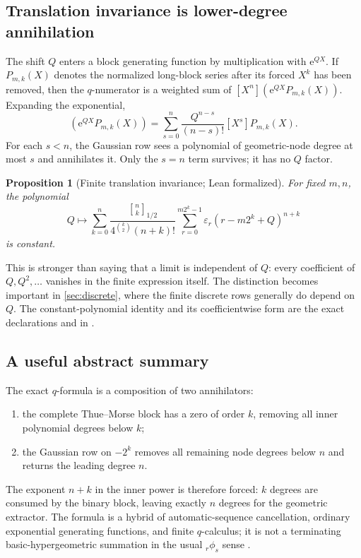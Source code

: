 \documentclass[11pt,oneside]{article}
\newtheorem{proposition}[theorem]{Proposition}
\theoremstyle{definition}
\theoremstyle{remark}
\newcommand{\e}{\mathrm e}
\newcommand{\qbinom}[3]{\genfrac{[}{]}{0pt}{}{#1}{#2}_{#3}}
\newcommand{\tm}{\varepsilon}
\begin{document}
\subsection{Translation invariance is lower-degree annihilation}

The shift $Q$ enters a block generating function by multiplication with $\e^{QX}$.  If
\(
 P_{m,k}(X)
\)
denotes the normalized long-block series after its forced $X^k$ has been removed, then the
$q$-numerator is a weighted sum of $[X^n](\e^{QX}P_{m,k}(X))$.  Expanding the exponential,
\begin{equation}
 [X^n](\e^{QX}P_{m,k}(X))
 =\sum_{s=0}^{n}\frac{Q^{n-s}}{(n-s)!}[X^s]P_{m,k}(X).     \label{eq:Q-expansion}
\end{equation}
For each $s<n$, the Gaussian row sees a polynomial of geometric-node degree at most $s$ and
annihilates it.  Only the $s=n$ term survives; it has no $Q$ factor.

\begin{proposition}[Finite translation invariance; Lean formalized]
\label{prop:finite-Q-invariance}
For fixed $m,n$, the polynomial
\begin{equation}
 Q\longmapsto
 \sum_{k=0}^{n}
 \frac{\qbinom nk{1/2}}{4^{\binom k2}(n+k)!}
 \sum_{r=0}^{m2^k-1}\tm_r(r-m2^k+Q)^{n+k}                 \label{eq:Q-polynomial}
\end{equation}
is constant.
\end{proposition}

This is stronger than saying that a limit is independent of $Q$: every coefficient of
$Q,Q^2,\ldots$ vanishes in the finite expression itself.  The distinction becomes important
in \cref{sec:discrete}, where the finite discrete rows generally do depend on $Q$.
The constant-polynomial identity and its coefficientwise form are the exact declarations
 and
 in
.

\subsection{A useful abstract summary}

The exact $q$-formula is a composition of two annihilators:
\begin{enumerate}
\item the complete Thue--Morse block has a zero of order $k$, removing all inner polynomial
      degrees below $k$;
\item the Gaussian row on $-2^k$ removes all remaining node degrees below $n$ and returns the
      leading degree $n$.
\end{enumerate}
The exponent $n+k$ in the inner power is therefore forced: $k$ degrees are consumed by the
binary block, leaving exactly $n$ degrees for the geometric extractor.  The formula is a
hybrid of automatic-sequence cancellation, ordinary exponential generating functions, and
finite $q$-calculus; it is not a terminating basic-hypergeometric summation in the usual
${}_r\phi_s$ sense \cite{gasper2004,dlmf17}.
\end{document}
